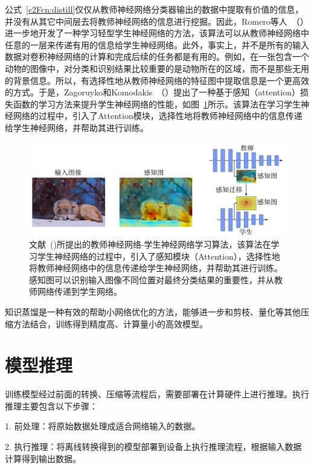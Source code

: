 公式~\ref{c2Fcn:distill}仅仅从教师神经网络分类器输出的数据中提取有价值的信息，并没有从其它中间层去将教师神经网络的信息进行挖掘。因此，Romero等人~（\cite{FitNet}）进一步地开发了一种学习轻型学生神经网络的方法，该算法可以从教师神经网络中任意的一层来传递有用的信息给学生神经网络。此外，事实上，并不是所有的输入数据对卷积神经网络的计算和完成后续的任务都是有用的。例如，在一张包含一个动物的图像中，对分类和识别结果比较重要的是动物所在的区域，而不是那些无用的背景信息。所以，有选择性地从教师神经网络的特征图中提取信息是一个更高效的方式。于是，Zagoruyko和Komodakis~（\cite{attentionTS}）提出了一种基于感知（attention）损失函数的学习方法来提升学生神经网络的性能，如图~\ref{c2Fig:AttentionTS}所示。该算法在学习学生神经网络的过程中，引入了Attention模块，选择性地将教师神经网络中的信息传递给学生神经网络，并帮助其进行训练。

\begin{figure}[t]
\begin{center}
\includegraphics[width=0.95\linewidth]{figs/ch09/ch09-AttentionTS.png}
\caption{文献~(\cite{attentionTS})所提出的教师神经网络-学生神经网络学习算法，该算法在学习学生神经网络的过程中，引入了感知模块（Attention），选择性地将教师神经网络中的信息传递给学生神经网络，并帮助其进行训练。感知图可以识别输入图像不同位置对最终分类结果的重要性，并从教师网络传递到学生网络。}
\label{c2Fig:AttentionTS}
\end{center}
\end{figure}

知识蒸馏是一种有效的帮助小网络优化的方法，能够进一步和剪枝、量化等其他压缩方法结合，训练得到精度高、计算量小的高效模型。

\section{模型推理}
训练模型经过前面的转换、压缩等流程后，需要部署在计算硬件上进行推理。执行推理主要包含以下步骤：

1. 前处理：将原始数据处理成适合网络输入的数据。

2. 执行推理：将离线转换得到的模型部署到设备上执行推理流程，根据输入数据计算得到输出数据。

